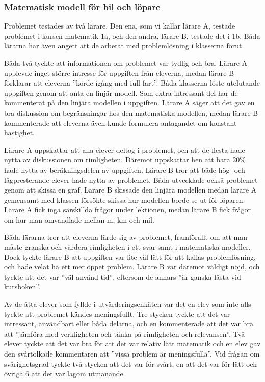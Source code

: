     \subsubsection{Matematisk modell för bil och löpare}
        \label{resultat:Lopare}
    
        \textcolor{lila}{Problemet testades av två lärare. Den ena, som vi kallar lärare A, testade problemet i kursen matematik 1a, och den andra, lärare B, testade det i 1b. Båda lärarna har även angett att de arbetat med problemlösning i klasserna förut.}
    
        \textcolor{lila}{Båda två tyckte att informationen om problemet var tydlig och bra. Lärare A upplevde inget större intresse för uppgiften från eleverna, medan lärare B förklarar att eleverna ''körde igång med full fart''. Båda klasserna löste utelutande uppgiften genom att anta en linjär modell. Som extra intressant del har de kommenterat på den linjära modellen i uppgiften. Lärare A säger att det gav en bra diskussion om begränsningar hos den matematiska modellen, medan lärare B kommenterade att eleverna även kunde formulera antagandet om konstant hastighet.}
    
        \textcolor{lila}{Lärare A uppskattar att alla elever deltog i problemet, och att de flesta hade nytta av diskussionen om rimligheten. Däremot uppskattar hen att bara $20\%$ hade nytta av beräkningsdelen av uppgiften. Lärare B tror att både hög- och lågpresterande elever hade nytta av problemet. Båda utvecklade också problemet genom att skissa en graf. Lärare B skissade den linjära modellen medan lärare A gemensamt med klassen försökte skissa hur modellen borde se ut för löparen. Lärare A fick inga särskillda frågor under lektionen, medan lärare B fick frågor om hur man omvandlade mellan m, km och mil.}
    
        \textcolor{lila}{Båda lärarna tror att eleverna lärde sig av problemet, framförallt om att man måste granska och värdera rimligheten i ett svar samt i matematiska modeller. Dock tyckte lärare B att uppgiften var lite väl lätt för att kallas problemlösning, och hade velat ha ett mer öppet problem. Lärare B var däremot väldigt nöjd, och tyckte att det var ''väl använd tid'', eftersom de annars ''är ganska låsta vid kursboken''.}
    
        \textcolor{lila}{Av de åtta elever som fyllde i utvärderingsenkäten var det en elev som inte alls tyckte att problemet kändes meningsfullt. Tre stycken tyckte att det var intressant, användbart eller båda delarna, och en kommenterade att det var bra att ''jämföra med verkligheten och tänka på rimligheten och relevansen''. Två elever tyckte att det var bra för att det var relativ lätt matematik och en elev gav den svårtolkade kommentaren att ''vissa problem är meningsfulla''. 
        Vid frågan om svårighetsgrad tyckte två stycken att det var för svårt, en att det var för lätt och övriga 6 att det var lagom utmanande.}
    
